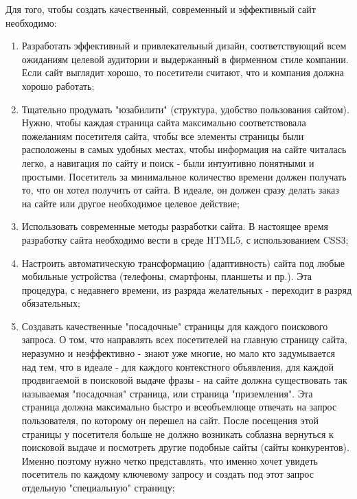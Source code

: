 Для того, чтобы создать качественный, современный и эффективный сайт необходимо:
\begin{enumerate}
    \item Разработать эффективный и привлекательный дизайн, соответствующий всем ожиданиям целевой аудитории и выдержанный в фирменном стиле компании. Если сайт выглядит хорошо, то посетители считают, что и компания должна хорошо работать;
    \item Тщательно продумать "юзабилити" (структура, удобство пользования сайтом).
    Нужно, чтобы каждая страница сайта максимально соответствовала пожеланиям посетителя сайта, чтобы все элементы страницы были расположены в самых удобных местах, чтобы информация на сайте читалась легко, а навигация по сайту и поиск - были интуитивно понятными и простыми.
    Посетитель за минимальное количество времени должен получать то, что он хотел получить от сайта.
    В идеале, он должен сразу делать заказ на сайте или другое необходимое целевое действие;

    \item Использовать современные методы разработки сайта.
    В настоящее время разработку сайта необходимо вести в среде HTML5, с использованием CSS3;
    \item Настроить автоматическую трансформацию (адаптивность) сайта под любые мобильные устройства (телефоны, смартфоны, планшеты и пр.). Эта процедура, с недавнего времени, из разряда желательных - переходит в разряд обязательных;


    \item Создавать качественные "посадочные" страницы для каждого поискового запроса.
    О том, что направлять всех посетителей на главную страницу сайта, неразумно и неэффективно - знают уже многие, но мало кто задумывается над тем, что в идеале - для каждого контекстного объявления, для каждой продвигаемой в поисковой выдаче фразы - на сайте должна существовать так называемая "посадочная" страница, или страница "приземления".
    Эта страница должна максимально быстро и всеобъемлюще отвечать на запрос пользователя, по которому он перешел на сайт.
    После посещения этой страницы у посетителя больше не должно возникать соблазна вернуться к поисковой выдаче и посмотреть другие подобные сайты (сайты конкурентов).
    Именно поэтому нужно четко представлять, что именно хочет увидеть посетитель по каждому ключевому запросу и создать под этот запрос отдельную "специальную" страницу;


\end{enumerate}

